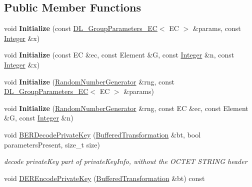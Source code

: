 \subsection*{Public Member Functions}
\begin{DoxyCompactItemize}
\item 
\hypertarget{class_d_l___private_key___e_c_a86c70f0ac9f1a4ce29aba6943a1007f3}{
void {\bfseries Initialize} (const \hyperlink{class_d_l___group_parameters___e_c}{DL\_\-GroupParameters\_\-EC}$<$ EC $>$ \&params, const \hyperlink{class_integer}{Integer} \&x)}
\label{class_d_l___private_key___e_c_a86c70f0ac9f1a4ce29aba6943a1007f3}

\item 
\hypertarget{class_d_l___private_key___e_c_abd6fda0f2ec2f011e4214b9c70e4440c}{
void {\bfseries Initialize} (const EC \&ec, const Element \&G, const \hyperlink{class_integer}{Integer} \&n, const \hyperlink{class_integer}{Integer} \&x)}
\label{class_d_l___private_key___e_c_abd6fda0f2ec2f011e4214b9c70e4440c}

\item 
\hypertarget{class_d_l___private_key___e_c_a853fce4b1b169096e2769d07f542deb1}{
void {\bfseries Initialize} (\hyperlink{class_random_number_generator}{RandomNumberGenerator} \&rng, const \hyperlink{class_d_l___group_parameters___e_c}{DL\_\-GroupParameters\_\-EC}$<$ EC $>$ \&params)}
\label{class_d_l___private_key___e_c_a853fce4b1b169096e2769d07f542deb1}

\item 
\hypertarget{class_d_l___private_key___e_c_ae83ecf84ebe689dab4be74df61c5593d}{
void {\bfseries Initialize} (\hyperlink{class_random_number_generator}{RandomNumberGenerator} \&rng, const EC \&ec, const Element \&G, const \hyperlink{class_integer}{Integer} \&n)}
\label{class_d_l___private_key___e_c_ae83ecf84ebe689dab4be74df61c5593d}

\item 
\hypertarget{class_d_l___private_key___e_c_a790483afe21298af518603dd50fff6cd}{
void \hyperlink{class_d_l___private_key___e_c_a790483afe21298af518603dd50fff6cd}{BERDecodePrivateKey} (\hyperlink{class_buffered_transformation}{BufferedTransformation} \&bt, bool parametersPresent, size\_\-t size)}
\label{class_d_l___private_key___e_c_a790483afe21298af518603dd50fff6cd}

\begin{DoxyCompactList}\small\item\em decode privateKey part of privateKeyInfo, without the OCTET STRING header \item\end{DoxyCompactList}\item 
\hypertarget{class_d_l___private_key___e_c_afc281492defbf652c0cdb1af4a9f3df7}{
void \hyperlink{class_d_l___private_key___e_c_afc281492defbf652c0cdb1af4a9f3df7}{DEREncodePrivateKey} (\hyperlink{class_buffered_transformation}{BufferedTransformation} \&bt) const }
\label{class_d_l___private_key___e_c_afc281492defbf652c0cdb1af4a9f3df7}


\end{DoxyCompactItemize}
